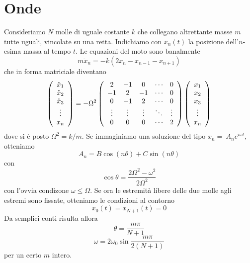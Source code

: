 \documentclass[a4paper,11pt]{article}
\begin{document}
\newpage
\section{Onde}
Consideriamo $N$ molle di uguale costante $k$ che collegano altrettante masse $m$ tutte uguali, vincolate su una retta. Indichiamo con $x_n(t)$ la posizione dell'$n$-esima massa al tempo $t$. Le equazioni del moto sono banalmente
\[m\ddot{x}_n=-k(2x_n-x_{n-1}-x_{n+1})\]
che in forma matriciale diventano
\[\left(\begin{array}{c}
\ddot{x}_1 \\
\ddot{x}_2 \\
\ddot{x}_3 \\
\vdots \\
{x}_n
\end{array}\right)=-\Omega^2\left(
\begin{array}{c c c c c}
2 & -1 & 0  & \cdots & 0 \\
-1 & 2 & -1 &\cdots & 0 \\
0 & -1 & 2 & \cdots & 0 \\
\vdots & \vdots & \vdots & \ddots & \vdots \\
0 & 0 & 0 & \cdots & 2 \\
\end{array}\right)
\left(\begin{array}{c}
x_1 \\ x_2 \\ x_3 \\ \vdots \\ x_n
\end{array}\right)\]
dove si è posto $\Omega^2=k/m$. Se immaginiamo una soluzione del tipo $x_n=~A_ne^{i\omega t}$, otteniamo
\[A_n=B\cos(n\theta)+C\sin(n\theta)\]
con
\[\cos\theta=\frac{2\Omega^2-\omega^2}{2\Omega^2}\]
con l'ovvia condizone $\omega\leq\Omega$.
Se ora le estremità libere delle due molle agli estremi sono fissate, otteniamo le condizioni al contorno
\[x_0(t)=x_{N+1}(t)=0\]
Da semplici conti risulta allora
\[\theta=\frac{m\pi}{N+1}\]
\[\omega=2\omega_0\sin\frac{m\pi}{2(N+1)}\]
per un certo $m$ intero.
\end{document}
